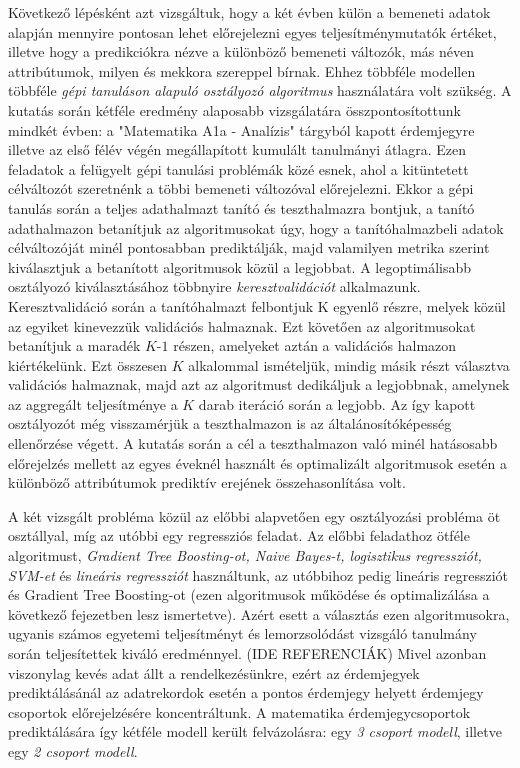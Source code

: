 \documentclass[12pt]{article}
\begin{document}
Következő lépésként azt vizsgáltuk, hogy a két évben külön a bemeneti adatok alapján mennyire pontosan lehet előrejelezni egyes teljesítménymutatók értéket, illetve hogy a predikciókra nézve a különböző bemeneti változók, más néven attribútumok, milyen és mekkora szereppel bírnak. Ehhez többféle modellen többféle \textit{gépi tanuláson alapuló osztályozó algoritmus} használatára volt szükség. A kutatás során kétféle eredmény alaposabb vizsgálatára összpontosítottunk mindkét évben: a "Matematika A1a - Analízis" tárgyból kapott érdemjegyre illetve az első félév végén megállapított kumulált tanulmányi átlagra. Ezen feladatok a felügyelt gépi tanulási problémák közé esnek, ahol a kitüntetett célváltozót szeretnénk a többi bemeneti változóval előrejelezni. Ekkor a gépi tanulás során a teljes adathalmazt tanító és teszthalmazra bontjuk, a tanító adathalmazon betanítjuk az algoritmusokat úgy, hogy a tanítóhalmazbeli adatok célváltozóját minél pontosabban prediktálják, majd valamilyen metrika szerint kiválasztjuk a betanított algoritmusok közül a legjobbat. A legoptimálisabb osztályozó kiválasztásához többnyire \textit{keresztvalidációt} alkalmazunk. Keresztvalidáció során a tanítóhalmazt felbontjuk K egyenlő részre, melyek közül az egyiket kinevezzük validációs halmaznak. Ezt követően az algoritmusokat betanítjuk a maradék $K$-$1$ részen, amelyeket aztán a validációs halmazon kiértékelünk. Ezt összesen $K$ alkalommal ismételjük, mindig másik részt választva validációs halmaznak, majd azt az algoritmust dedikáljuk a legjobbnak, amelynek az aggregált teljesítménye a $K$ darab iteráció során a legjobb. Az így kapott osztályozót még visszamérjük a teszthalmazon is az általánosítóképesség ellenőrzése végett. A kutatás során a cél a teszthalmazon való minél hatásosabb előrejelzés mellett az egyes éveknél használt és optimalizált algoritmusok esetén a különböző attribútumok prediktív erejének összehasonlítása volt.

A két vizsgált probléma közül az előbbi alapvetően egy osztályozási probléma öt osztállyal, míg az utóbbi egy regressziós feladat. Az előbbi feladathoz ötféle algoritmust, \textit{Gradient Tree Boosting-ot, Naive Bayes-t, logisztikus regressziót, SVM-et} és \textit{lineáris regressziót} használtunk, az utóbbihoz pedig lineáris regressziót és Gradient Tree Boosting-ot (ezen algoritmusok működése és optimalizálása a következő fejezetben lesz ismertetve). Azért esett a választás ezen algoritmusokra, ugyanis számos egyetemi teljesítményt és lemorzsolódást vizsgáló tanulmány során teljesítettek kiváló eredménnyel. (IDE REFERENCIÁK) Mivel azonban viszonylag kevés adat állt a rendelkezésünkre, ezért az érdemjegyek prediktálásánál az adatrekordok esetén a pontos érdemjegy helyett érdemjegy csoportok előrejelzésére koncentráltunk. A matematika érdemjegycsoportok prediktálására így kétféle modell került felvázolásra: egy \textit{3 csoport modell}, illetve egy \textit{2 csoport modell}.
\end{document}
